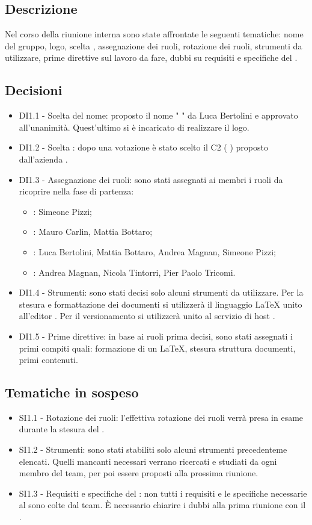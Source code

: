 \documentclass[a4paper,titlepage]{article}
\begin{document}
 \subsection{Descrizione}
 Nel corso della riunione interna sono state affrontate le seguenti tematiche: nome del gruppo, logo, scelta , assegnazione dei ruoli, rotazione dei ruoli, strumenti da utilizzare, prime direttive sul lavoro da fare, dubbi su requisiti e specifiche del .
 \subsection{Decisioni}
 \begin{itemize}
  \item DI1.1 - Scelta del nome: proposto il nome " \GRUPPO{} " da Luca Bertolini e approvato all'unanimità. Quest'ultimo si è incaricato di realizzare il logo.
  \item DI1.2 - Scelta : dopo una votazione è stato scelto il  C2 ( \PROGETTO) proposto dall'azienda \PROPONENTE.
  \item DI1.3 - Assegnazione dei ruoli: sono stati assegnati ai membri i ruoli da ricoprire nella fase di partenza:
  \begin{itemize}
  \item \RESP: Simeone Pizzi;
  \item \AMMP: Mauro Carlin, Mattia Bottaro;
  \item \VERP: Luca Bertolini, Mattia Bottaro, Andrea Magnan, Simeone Pizzi;
  \item \ANP: Andrea Magnan, Nicola Tintorri, Pier Paolo Tricomi.
  \end{itemize}
  \item DI1.4 - Strumenti: sono stati decisi solo alcuni strumenti da utilizzare. Per la stesura e formattazione dei documenti si utilizzerà il linguaggio \LaTeX{}{} unito all'editor . Per il versionamento si utilizzerà  unito al servizio di host . 
  \item DI1.5 - Prime direttive: in base ai ruoli prima decisi, sono stati assegnati i primi compiti quali: formazione di un  \LaTeX{}{}, stesura struttura documenti, primi contenuti.
 \end{itemize}

\subsection{Tematiche in sospeso} 
  \begin{itemize}
  \item SI1.1 - Rotazione dei ruoli: l'effettiva rotazione dei ruoli verrà presa in esame durante la stesura del \PPdoc.
  \item SI1.2 - Strumenti: sono stati stabiliti solo alcuni strumenti precedenteme elencati. Quelli mancanti necessari verrano ricercati e studiati da ogni membro del team, per poi essere proposti alla prossima riunione.
  \item SI1.3 - Requisiti e specifiche del : non tutti i requisiti e le specifiche necessarie al  sono colte dal team. È necessario chiarire i dubbi alla prima riunione con il .
  \end{itemize}
\end{document}
